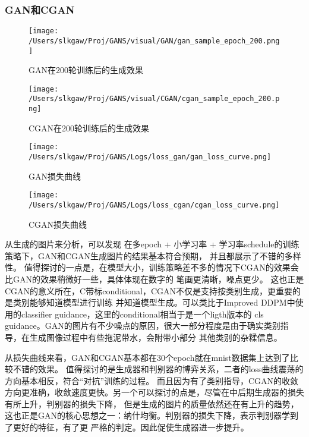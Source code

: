 \documentclass[12pt, a4paper]{article}
\begin{document}
\subsubsection{GAN和CGAN}
\begin{figure}[htbp]
    \centering
    \begin{minipage}[t]{0.45\textwidth}
        \centering
        \texttt{[image: /Users/slkgaw/Proj/GANS/visual/GAN/gan\_sample\_epoch\_200.png]}
        \caption{GAN在200轮训练后的生成效果}
    \end{minipage}
    \hspace{0.04\textwidth}
    \begin{minipage}[t]{0.45\textwidth}
        \centering
        \texttt{[image: /Users/slkgaw/Proj/GANS/visual/CGAN/cgan\_sample\_epoch\_200.png]}
        \caption{CGAN在200轮训练后的生成效果}
    \end{minipage}
\end{figure}

\begin{figure}[htbp]
    \centering
    \texttt{[image: /Users/slkgaw/Proj/GANS/Logs/loss\_gan/gan\_loss\_curve.png]}
    \caption{GAN损失曲线}
\end{figure}
\clearpage
\begin{figure}[htbp]
    \texttt{[image: /Users/slkgaw/Proj/GANS/Logs/loss\_cgan/cgan\_loss\_curve.png]}
    \caption{CGAN损失曲线}
\end{figure}

从生成的图片来分析，可以发现 在多epoch + 小学习率 + 学习率schedule的训练策略下，GAN和CGAN生成图片的结果基本符合预期，
并且都展示了不错的多样性。
值得探讨的一点是，在模型大小，训练策略差不多的情况下CGAN的效果会比GAN的效果稍微好一些，具体体现在数字的
笔画更清晰，噪点更少。
这也正是CGAN的意义所在，C带标conditional，CGAN不仅是支持按类别生成，更重要的是类别能够知道模型进行训练
并知道模型生成。可以类比于Improved DDPM中使用的classifier guidance，这里的conditional相当于是一个ligth版本的
cls guidance。GAN的图片有不少噪点的原因，很大一部分程度是由于确实类别指导，在生成图像过程中有些拖泥带水，会附带小部分
其他类别的杂糅信息。

从损失曲线来看，GAN和CGAN基本都在30个epoch就在mnist数据集上达到了比较不错的效果。
值得探讨的是生成器和判别器的博弈关系，二者的loss曲线震荡的方向基本相反，符合“对抗”训练的过程。
而且因为有了类别指导，CGAN的收敛方向更准确，收敛速度更快。另一个可以探讨的点是，尽管在中后期生成器的损失有所上升，判别器的损失下降，
但是生成的图片的质量依然还在有上升的趋势，这也正是GAN的核心思想之一：纳什均衡。判别器的损失下降，表示判别器学到了更好的特征，有了更
严格的判定。因此促使生成器进一步提升。
\end{document}
